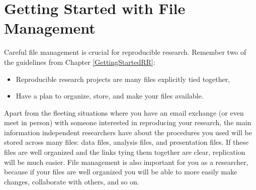 



\chapter{Getting Started with File Management}\label{DirectoriesChapter}

Careful file management is crucial for reproducible research. Remember two of the guidelines from Chapter \ref{GettingStartedRR}:

\begin{itemize}
    \item Reproducible research projects are many files explicitly tied together,
    \item Have a plan to organize, store, and make your files available. 
\end{itemize}

Apart from the fleeting situations where you have an email exchange (or even meet in person) with someone interested in reproducing your research, the main information independent researchers have about the procedures you used will be stored across many files: data files, analysis files, and presentation files. If these files are well organized and the links tying them together are clear, replication will be much easier. File management is also important for you as a researcher, because if your files are well organized you will be able to more easily make changes, collaborate with others, and so on. 

